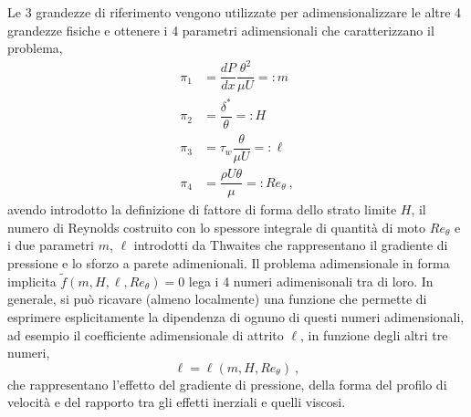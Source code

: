 Le 3 grandezze di riferimento vengono utilizzate per adimensionalizzare le altre 4 grandezze fisiche e ottenere i 4 parametri adimensionali che caratterizzano il problema,
\begin{equation}
\begin{aligned}
 \pi_1 & = \dfrac{dP}{dx} \dfrac{\theta^2}{\mu U} =: m \\
 \pi_2 & = \dfrac{\delta^*}{\theta}               =: H \\
 \pi_3 & = \tau_w \dfrac{\theta}{\mu U}           =: \ell \\
 \pi_4 & = \dfrac{\rho U \theta}{\mu}             =: Re_{\theta} \ ,
\end{aligned}
\end{equation}
%
avendo introdotto la definizione di fattore di forma dello strato limite $H$, il numero di Reynolds costruito con lo spessore integrale di quantità di moto $Re_{\theta}$ e i due parametri $m$, $\ell$ introdotti da Thwaites che rappresentano il gradiente di pressione e lo sforzo a parete adimenionali. Il problema adimensionale in forma implicita $\tilde{f}(m, H, \ell, Re_{\theta}) = 0$ lega i 4 numeri adimenisonali tra di loro. In generale, si può ricavare (almeno localmente) una funzione che permette di esprimere esplicitamente la dipendenza di ognuno di questi numeri adimensionali, ad esempio il coefficiente adimensionale di attrito $\ell$, in funzione degli altri tre numeri,
\begin{equation}
 \ell = \ell( m, H, Re_{\theta} ) \ ,
\end{equation}
che rappresentano l'effetto del gradiente di pressione, della forma del profilo di velocità e del rapporto tra gli effetti inerziali e quelli viscosi.

